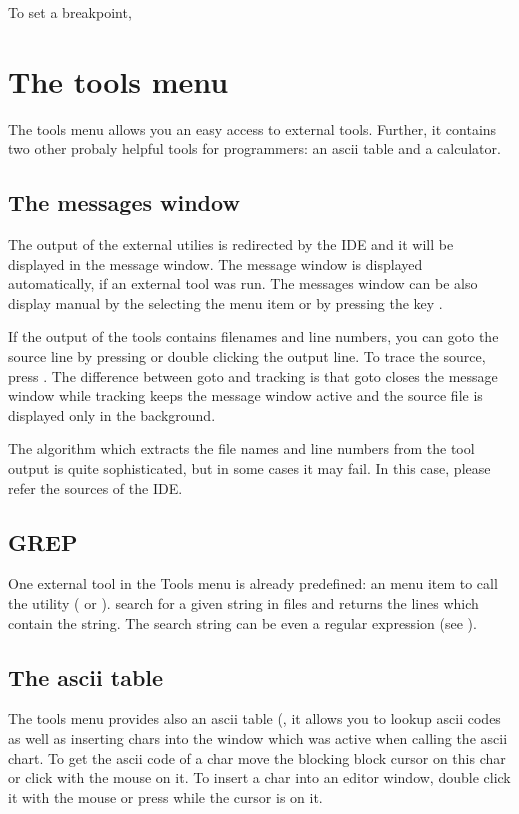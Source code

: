 To set a breakpoint,


\section{The tools menu}
\label{se:toolsmenu}
The tools menu allows you an easy access to external tools. Further,
it contains two other probaly helpful tools for programmers: an
ascii table and a calculator.

\subsection{The messages window}
\label{se:toolsmessages}
The output of the external utilies is redirected by the IDE and it
will be displayed in the message window. The message window is
displayed automatically, if an external tool was run. The
messages window can be also display manual by the selecting the
menu item  or by pressing the key .

If the output of the tools contains filenames and line numbers,
you can goto the source line by pressing  or
double clicking the output line. To trace the source, press
. The difference between goto and tracking is that
goto closes the message window while tracking keeps the message
window active and the source file is displayed only in the background.

The algorithm which extracts the file names and line numbers from
the tool output is quite sophisticated, but in some cases it may
fail. In this case, please refer the sources of the IDE.

\subsection{GREP}
\label{se:grep}
One external tool in the Tools menu is already predefined: an
menu item to call the  utility ( or
).  search for a given string in files and
returns the lines which contain the string. The search string can
be even a regular expression (see ).

\subsection{The ascii table}
\label{se:asciitable}
The tools menu provides also an ascii table (,
it allows you to lookup ascii codes as well as
inserting chars into the window which was active when calling the
ascii chart. To get the ascii code of a char move the blocking block
cursor on this char or click with the mouse on it. To insert a
char into an editor window, double click it with the mouse
or press  while the cursor is on it.

